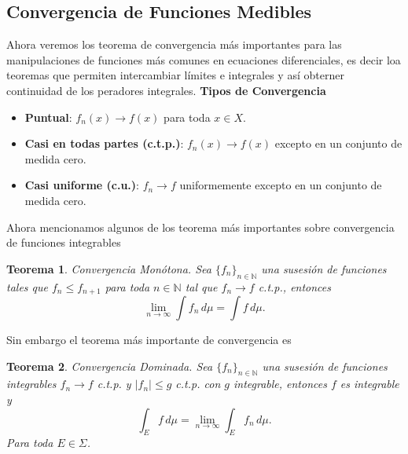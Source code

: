 \documentclass[letterpaper]{book}
\newtheorem{teorema}{Teorema}[section]
\newcommand{\nat}{\ensuremath{ \mathbb N }}
\newcommand{\sig}{\ensuremath{\Sigma}}
\begin{document}
\subsection{Convergencia de Funciones Medibles}
\noindent Ahora veremos los teorema de convergencia más importantes para las manipulaciones de funciones más comunes en ecuaciones diferenciales, es decir loa teoremas que permiten intercambiar límites e integrales y así obterner continuidad de los peradores integrales.
\noindent\textbf{Tipos de Convergencia}
\begin{itemize}
    \item \textbf{Puntual}: $f_n(x) \to f(x)$ para toda $x\in X$.
    \item \textbf{Casi en todas partes (c.t.p.)}: $f_n(x) \to f(x)$ excepto en un conjunto de medida cero.
    \item \textbf{Casi uniforme (c.u.)}: $f_n \to f$ uniformemente excepto en un conjunto de medida cero.
\end{itemize}
Ahora mencionamos algunos de los teorema más importantes sobre convergencia de funciones integrables
\begin{teorema}{Convergencia Monótona.}
  Sea $\{f_n\}_{n\in\nat}$ una susesión de funciones tales que $f_n \leq f_{n+1}$ para toda $n\in\nat$ tal que $f_n\to f$ c.t.p., entonces
\[
  \lim_{n \to \infty} \int f_n \, d\mu = \int f \, d\mu.
  \]
  \end{teorema}
Sin embargo el teorema más importante de convergencia es
\begin{teorema}{Convergencia Dominada.}
Sea $\{f_n\}_{n\in\nat}$ una susesión de funciones integrables $f_n \to f$ c.t.p. y $|f_n| \leq g$ c.t.p. con $g$ integrable, entonces $f$ es integrable y
\[
 \int_E f \, d\mu=\lim_{n \to \infty} \int_E f_n \, d\mu.
\]
\noindent Para toda $E\in\sig$.
\end{teorema}
\end{document}

